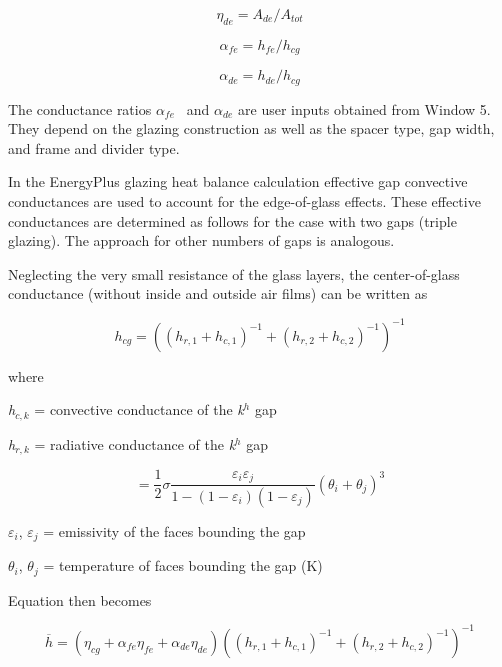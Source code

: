 \begin{equation}
{\eta_{de}} = {A_{de}}/{A_{tot}}
\end{equation}

\begin{equation}
{\alpha_{fe}} = {h_{fe}}/{h_{cg}}
\end{equation}

\begin{equation}
{\alpha_{de}} = {h_{de}}/{h_{cg}}
\end{equation}

The conductance ratios \({\alpha_{fe}}\) ~and \({\alpha_{de}}\) are user inputs obtained from Window 5. They depend on the glazing construction as well as the spacer type, gap width, and frame and divider type.

In the EnergyPlus glazing heat balance calculation effective gap convective conductances are used to account for the edge-of-glass effects. These effective conductances are determined as follows for the case with two gaps (triple glazing). The approach for other numbers of gaps is analogous.

Neglecting the very small resistance of the glass layers, the center-of-glass conductance (without inside and outside air films) can be written as

\begin{equation}
{h_{cg}} = {\left( {{{\left( {{h_{r,1}} + {h_{c,1}}} \right)}^{ - 1}} + {{\left( {{h_{r,2}} + {h_{c,2}}} \right)}^{ - 1}}} \right)^{ - 1}}
\end{equation}

where

\emph{h\(_{c,k}\)} = convective conductance of the \emph{k\(^{h}\)} gap

\emph{h\(_{r,k}\)} = radiative conductance of the \emph{k\(^{h}\)} gap

\begin{equation}
= \frac{1}{2}\sigma \frac{{{\varepsilon_i}{\varepsilon_j}}}{{1 - \left( {1 - {\varepsilon_i}} \right)\left( {1 - {\varepsilon_j}} \right)}}{\left( {{\theta_i} + {\theta_j}} \right)^3}
\end{equation}

$\varepsilon$\(_{i}\), $\varepsilon$\(_{j}\) = emissivity of the faces bounding the gap

$\theta$\(_{i}\), $\theta$\(_{j}\) = temperature of faces bounding the gap (K)

Equation then becomes

\begin{equation}
\overline h  = \left( {{\eta_{cg}} + {\alpha_{fe}}{\eta_{fe}} + {\alpha_{de}}{\eta_{de}}} \right){\left( {{{\left( {{h_{r,1}} + {h_{c,1}}} \right)}^{ - 1}} + {{\left( {{h_{r,2}} + {h_{c,2}}} \right)}^{ - 1}}} \right)^{ - 1}}
\end{equation}


